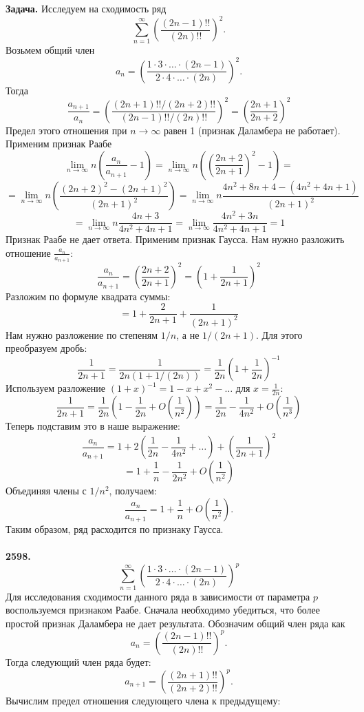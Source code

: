 \documentclass[a4paper, 12pt]{report}
\numberwithin{equation}{section}
\begin{document}
	\noindent\textbf{Задача.}
	Исследуем на сходимость ряд 
	$$\sum_{n=1}^{\infty} \left(\frac{(2n-1)!!}{(2n)!!}\right)^2.$$
	Возьмем общий член $$a_n = \left(\frac{1 \cdot 3 \cdot \ldots \cdot (2n-1)}{2 \cdot 4 \cdot \ldots \cdot (2n)}\right)^2.$$
	Тогда
	$$ \frac{a_{n+1}}{a_n} = \left(\frac{(2n+1)!! / (2n+2)!!}{(2n-1)!! / (2n)!!}\right)^2 = \left(\frac{2n+1}{2n+2}\right)^2 $$
	Предел этого отношения при $n \to \infty$ равен 1 (признак Даламбера не работает).
	Применим признак Раабе
	$$\lim_{n \to \infty} n \left( \frac{a_n}{a_{n+1}} - 1 \right) = \lim_{n \to \infty} n \left( \left(\frac{2n+2}{2n+1}\right)^2 - 1 \right)= $$
	$$ = \lim_{n \to \infty} n \left( \frac{(2n+2)^2 - (2n+1)^2}{(2n+1)^2} \right) = \lim_{n \to \infty} n \frac{4n^2+8n+4 - (4n^2+4n+1)}{(2n+1)^2} $$
	$$ = \lim_{n \to \infty} n \frac{4n+3}{4n^2+4n+1} = \lim_{n \to \infty} \frac{4n^2+3n}{4n^2+4n+1} = 1 $$
	Признак Раабе не дает ответа. Применим признак Гаусса. Нам нужно разложить отношение $\frac{a_n}{a_{n+1}}$:
	$$ \frac{a_n}{a_{n+1}} = \left(\frac{2n+2}{2n+1}\right)^2 = \left(1 + \frac{1}{2n+1}\right)^2 $$
	Разложим по формуле квадрата суммы:
	$$ = 1 + \frac{2}{2n+1} + \frac{1}{(2n+1)^2} $$
	Нам нужно разложение по степеням $1/n$, а не $1/(2n+1)$. Для этого преобразуем дробь:
	$$ \frac{1}{2n+1} = \frac{1}{2n(1 + 1/(2n))} = \frac{1}{2n} \left(1 + \frac{1}{2n}\right)^{-1} $$
	Используем разложение $(1+x)^{-1} = 1 - x + x^2 - \ldots$ для $x = \frac{1}{2n}$:
	$$ \frac{1}{2n+1} = \frac{1}{2n} \left(1 - \frac{1}{2n} + O\left(\frac{1}{n^2}\right)\right) = \frac{1}{2n} - \frac{1}{4n^2} + O\left(\frac{1}{n^3}\right) $$
	Теперь подставим это в наше выражение:
	$$ \frac{a_n}{a_{n+1}} = 1 + 2\left(\frac{1}{2n} - \frac{1}{4n^2} + \ldots\right) + \left(\frac{1}{2n+1}\right)^2 $$
	$$ = 1 + \frac{1}{n} - \frac{1}{2n^2} + O\left(\frac{1}{n^2}\right) $$
	Объединяя члены с $1/n^2$, получаем:
	$$ \frac{a_n}{a_{n+1}} = 1 + \frac{1}{n} + O\left(\frac{1}{n^2}\right).$$
	Таким образом, ряд расходится по признаку Гаусса.
	\\\\
	\textbf{2598.}
	$$ \sum_{n=1}^{\infty} \left(\frac{1 \cdot 3 \cdot \ldots \cdot (2n-1)}{2 \cdot 4 \cdot \ldots \cdot (2n)}\right)^p $$
	Для исследования сходимости данного ряда в зависимости от параметра $p$ воспользуемся признаком Раабе. Сначала необходимо убедиться, что более простой признак Даламбера не дает результата. Обозначим общий член ряда как
	$$ a_n = \left(\frac{(2n-1)!!}{(2n)!!}\right)^p. $$
	Тогда следующий член ряда будет:
	$$ a_{n+1} = \left(\frac{(2n+1)!!}{(2n+2)!!}\right)^p. $$
	Вычислим предел отношения следующего члена к предыдущему:
\end{document}
